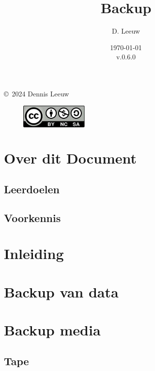 \documentclass[a4paper,12pt,twoside,openright,titlepage]{book}
\author{D. Leeuw}
\title{Backup}
\date{\today\\v.0.6.0}
\begin{document}

\maketitle

\copyright\ 2024 Dennis Leeuw\\

\begin{figure}
\includegraphics[width=0.3\textwidth]{CC-BY-SA-NC.png}
\end{figure}

\bigskip




\frontmatter
\chapter{Over dit Document}
\section{Leerdoelen}

\section{Voorkennis}


\tableofcontents

\mainmatter
\chapter{Inleiding}


\chapter{Backup van data}


\chapter{Backup media}

\section{Tape}

\end{document}

